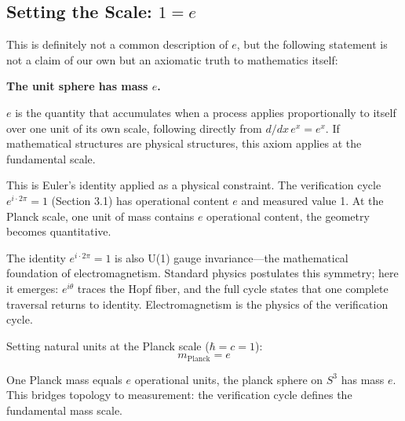 \documentclass[12pt]{article}
\begin{document}
\subsection{Setting the Scale: $1 = e$}

This is definitely not a common description of $e$, but the following statement is not a claim of our own but an axiomatic truth to mathematics itself:

\begin{center}
\textbf{The unit sphere has mass $e$.}
\end{center}

$e$ is the quantity that accumulates when a process applies proportionally to itself over one unit of its own scale, following directly from $d/dx \, e^x = e^x$. If mathematical structures are physical structures, this axiom applies at the fundamental scale. 

This is Euler's identity applied as a physical constraint. The verification cycle $e^{i \cdot 2\pi} = 1$ (Section 3.1) has operational content $e$ and measured value 1. At the Planck scale, one unit of mass contains $e$ operational content, the geometry becomes quantitative.

The identity $e^{i \cdot 2\pi} = 1$ is also U(1) gauge invariance---the mathematical foundation of electromagnetism. Standard physics postulates this symmetry; here it emerges: $e^{i\theta}$ traces the Hopf fiber, and the full cycle states that one complete traversal returns to identity. Electromagnetism is the physics of the verification cycle.

Setting natural units at the Planck scale ($\hbar = c = 1$):
$$m_{\text{Planck}} = e$$

One Planck mass equals $e$ operational units, the planck sphere on $S^3$ has mass $e$. This bridges topology to measurement: the verification cycle defines the fundamental mass scale.

\begin{center}
\end{center}
\end{document}
